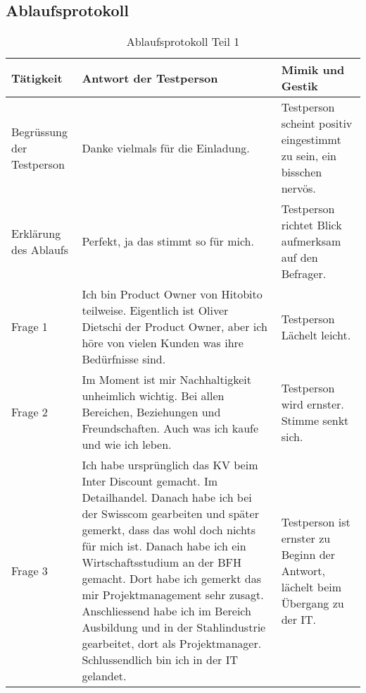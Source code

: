 \subsection{Ablaufsprotokoll}
\begin{table}[h!]
   \begin{tabular}{|L{0.2\textwidth}|L{0.4\textwidth}|L{0.3\textwidth}|}
       \hline
       \color{white}Tätigkeit & \color{white} Antwort der Testperson & \color{white} Mimik und Gestik \\
       \hline
       Begrüssung der Testperson & Danke vielmals für die Einladung. & Testperson scheint positiv eingestimmt zu sein, ein bisschen nervös. \\
       \hline
       Erklärung des Ablaufs & Perfekt, ja das stimmt so für mich. & Testperson richtet Blick aufmerksam auf den Befrager. \\
       \hline
       Frage 1 & Ich bin Product Owner von Hitobito teilweise. Eigentlich ist Oliver Dietschi der Product Owner, aber ich höre von vielen Kunden was ihre Bedürfnisse sind. & Testperson Lächelt leicht. \\
       \hline
       Frage 2 & Im Moment ist mir Nachhaltigkeit unheimlich wichtig. Bei allen Bereichen, Beziehungen und Freundschaften. Auch was ich kaufe und wie ich leben. & Testperson wird ernster. Stimme senkt sich. \\
       \hline
       Frage 3 & Ich habe ursprünglich das KV beim Inter Discount gemacht. Im Detailhandel. Danach habe ich bei der Swisscom gearbeiten und später gemerkt, dass das wohl doch nichts für mich ist. Danach habe ich ein
       Wirtschaftsstudium an der BFH gemacht. Dort habe ich gemerkt das mir Projektmanagement sehr zusagt. Anschliessend habe ich im Bereich Ausbildung und in der Stahlindustrie gearbeitet, dort als Projektmanager.
       Schlussendlich bin ich in der IT gelandet. & Testperson ist ernster zu Beginn der Antwort, lächelt beim Übergang zu der IT.   \\
       \hline
     \end{tabular}
     \caption{Ablaufsprotokoll Teil 1}
\end{table}

\newpage

